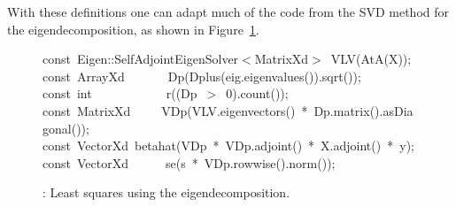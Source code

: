 \documentclass[shortnames,article]{jss}
\newcommand{\hlstd}[1]{\textcolor[rgb]{0,0,0}{#1}}
\newcommand{\hlnum}[1]{\textcolor[rgb]{0,0,0}{#1}}
\newcommand{\hlopt}[1]{\textcolor[rgb]{0,0,0}{#1}}
\newcommand{\hlkwb}[1]{\textcolor[rgb]{0.13,0.54,0.13}{#1}}
\newcommand{\hlkwd}[1]{\textcolor[rgb]{0,0,0}{#1}}
\begin{document}
With these definitions one can adapt much of the code from the SVD
method for the eigendecomposition, as shown in Figure~\ref{SymmEigLS}.
\begin{figure}[htb]
    \noindent
    \ttfamily
    \hlkwb{const\ }\hlstd{Eigen}\hlopt{::}\hlstd{SelfAdjointEigenSolver}\hlopt{$<$}\hlstd{MatrixXd}\hlopt{$>$\ }\hlstd{}\hlkwd{VLV}\hlstd{}\hlopt{(}\hlstd{}\hlkwd{AtA}\hlstd{}\hlopt{(}\hlstd{X}\hlopt{));}\hspace*{\fill}\\
    \hlstd{}\hlkwb{const\ }\hlstd{ArrayXd}\hlstd{\ \ \ \ \ \ \ }\hlstd{}\hlkwd{Dp}\hlstd{}\hlopt{(}\hlstd{}\hlkwd{Dplus}\hlstd{}\hlopt{(}\hlstd{eig}\hlopt{.}\hlstd{}\hlkwd{eigenvalues}\hlstd{}\hlopt{()).}\hlstd{}\hlkwd{sqrt}\hlstd{}\hlopt{());}\hspace*{\fill}\\
    \hlstd{}\hlkwb{const\ int}\hlstd{\ \ \ \ \ \ \ \ \ \ \ \ }\hlkwb{}\hlstd{}\hlkwd{r}\hlstd{}\hlopt{((}\hlstd{Dp\ }\hlopt{$>$\ }\hlstd{}\hlnum{0}\hlstd{}\hlopt{).}\hlstd{}\hlkwd{count}\hlstd{}\hlopt{());}\hspace*{\fill}\\
    \hlstd{}\hlkwb{const\ }\hlstd{MatrixXd}\hlstd{\ \ \ \ \ }\hlstd{}\hlkwd{VDp}\hlstd{}\hlopt{(}\hlstd{VLV}\hlopt{.}\hlstd{}\hlkwd{eigenvectors}\hlstd{}\hlopt{()\ {*}\ }\hlstd{Dp}\hlopt{.}\hlstd{}\hlkwd{matrix}\hlstd{}\hlopt{().}\hlstd{}\hlkwd{asDiagonal}\hlstd{}\hlopt{());}\hspace*{\fill}\\
    \hlstd{}\hlkwb{const\ }\hlstd{VectorXd\ }\hlkwd{betahat}\hlstd{}\hlopt{(}\hlstd{VDp\ }\hlopt{{*}\ }\hlstd{VDp}\hlopt{.}\hlstd{}\hlkwd{adjoint}\hlstd{}\hlopt{()\ {*}\ }\hlstd{X}\hlopt{.}\hlstd{}\hlkwd{adjoint}\hlstd{}\hlopt{()\ {*}\ }\hlstd{y}\hlopt{);}\hspace*{\fill}\\
    \hlstd{}\hlkwb{const\ }\hlstd{VectorXd}\hlstd{\ \ \ \ \ \ }\hlstd{}\hlkwd{se}\hlstd{}\hlopt{(}\hlstd{s\ }\hlopt{{*}\ }\hlstd{VDp}\hlopt{.}\hlstd{}\hlkwd{rowwise}\hlstd{}\hlopt{().}\hlstd{}\hlkwd{norm}\hlstd{}\hlopt{());}\hlstd{}\hspace*{\fill}\\
    \mbox{}
    \normalfont
    \normalsize
  \caption{: Least squares using the eigendecomposition.}
  \label{SymmEigLS}
\end{figure}
\end{document}
